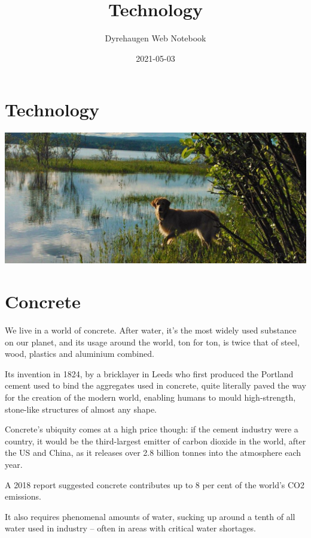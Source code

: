 \documentclass[
]{book}
\title{Technology}
\author{Dyrehaugen Web Notebook}
\date{2021-05-03}
\begin{document}
\maketitle

{
\setcounter{tocdepth}{1}
\tableofcontents
}
\hypertarget{technology}{%
\chapter{Technology}\label{technology}}

\includegraphics{fig/zelda.jpg}

\hypertarget{concrete}{%
\chapter{Concrete}\label{concrete}}

We live in a world of concrete. After water, it's the most widely used substance on our planet, and its usage around the world, ton for ton, is twice that of steel, wood, plastics and aluminium combined.

Its invention in 1824, by a bricklayer in Leeds who first produced the Portland cement used to bind the aggregates used in concrete, quite literally paved the way for the creation of the modern world, enabling humans to mould high-strength, stone-like structures of almost any shape.

Concrete's ubiquity comes at a high price though: if the cement industry were a country, it would be the third-largest emitter of carbon dioxide in the world, after the US and China, as it releases over 2.8 billion tonnes into the atmosphere each year.

A 2018 report suggested concrete contributes up to 8 per cent of the world's CO2 emissions.

It also requires phenomenal amounts of water, sucking up around a tenth of all water used in industry -- often in areas with critical water shortages.
\end{document}
